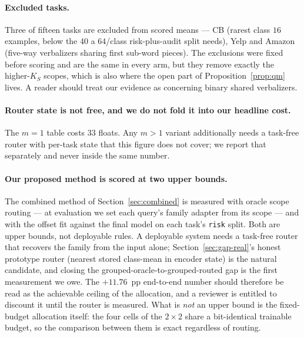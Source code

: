 \paragraph{Excluded tasks.}
Three of fifteen tasks are excluded from scored means --- CB (rarest class $16$
examples, below the $40$ a $64$/class risk-plus-audit split needs), Yelp and Amazon
(five-way verbalizers sharing first sub-word pieces). The exclusions were fixed
before scoring and are the same in every arm, but they remove exactly the
higher-$K_S$ scopes, which is also where the open part of
Proposition~\ref{prop:qm} lives. A reader should treat our evidence as concerning
binary shared verbalizers.

\paragraph{Router state is not free, and we do not fold it into our headline cost.}
The $m{=}1$ table costs $33$ floats. Any $m>1$ variant additionally needs a
task-free router with per-task state that this figure does not cover; we report
that separately and never inside the same number.

\paragraph{Our proposed method is scored at two upper bounds.}
The combined method of Section~\ref{sec:combined} is measured with oracle scope
routing --- at evaluation we set each query's family adapter from its scope --- and
with the offset fit against the final model on each task's \texttt{risk} split. Both
are upper bounds, not deployable rules. A deployable system needs a task-free router
that recovers the family from the input alone; Section~\ref{sec:gap-real}'s honest
prototype router (nearest stored class-mean in encoder state) is the natural
candidate, and closing the grouped-oracle-to-grouped-routed gap is the first
measurement we owe. The $+11.76$~pp end-to-end number should therefore be read as the
achievable ceiling of the allocation, and a reviewer is entitled to discount it until
the router is measured. What is \emph{not} an upper bound is the fixed-budget
allocation itself: the four cells of the $2\times2$ share a bit-identical trainable
budget, so the comparison between them is exact regardless of routing.

